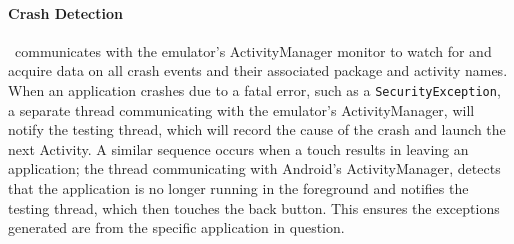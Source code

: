 \paragraph{\bfseries Crash Detection}
\toolname\ communicates with the emulator's ActivityManager monitor to watch for and acquire data on all crash events and their associated package and activity names.  When an application crashes due to a fatal error, such as a \texttt{SecurityException}, a separate thread communicating with the emulator's ActivityManager, will notify the testing thread, which will record the cause of the crash and launch the next Activity.  A similar sequence occurs when a touch results in leaving an application; the thread communicating with Android's ActivityManager, detects that the application is no longer running in the foreground and notifies the testing thread, which then touches the back button.  This ensures the exceptions generated are from the specific application in question.